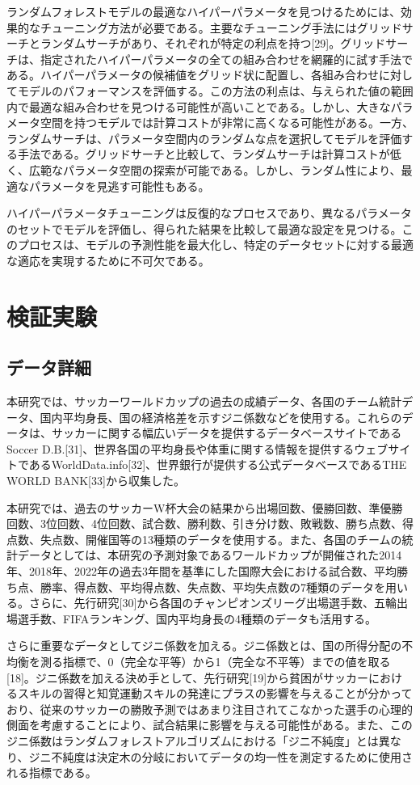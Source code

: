 \documentclass[platex]{suribt}
\begin{document}
ランダムフォレストモデルの最適なハイパーパラメータを見つけるためには、効果的なチューニング方法が必要である。主要なチューニング手法にはグリッドサーチとランダムサーチがあり、それぞれが特定の利点を持つ[29]。グリッドサーチは、指定されたハイパーパラメータの全ての組み合わせを網羅的に試す手法である。ハイパーパラメータの候補値をグリッド状に配置し、各組み合わせに対してモデルのパフォーマンスを評価する。この方法の利点は、与えられた値の範囲内で最適な組み合わせを見つける可能性が高いことである。しかし、大きなパラメータ空間を持つモデルでは計算コストが非常に高くなる可能性がある。一方、ランダムサーチは、パラメータ空間内のランダムな点を選択してモデルを評価する手法である。グリッドサーチと比較して、ランダムサーチは計算コストが低く、広範なパラメータ空間の探索が可能である。しかし、ランダム性により、最適なパラメータを見逃す可能性もある。

ハイパーパラメータチューニングは反復的なプロセスであり、異なるパラメータのセットでモデルを評価し、得られた結果を比較して最適な設定を見つける。このプロセスは、モデルの予測性能を最大化し、特定のデータセットに対する最適な適応を実現するために不可欠である。


\chapter{検証実験}
\section{データ詳細}
本研究では、サッカーワールドカップの過去の成績データ、各国のチーム統計データ、国内平均身長、国の経済格差を示すジニ係数などを使用する。これらのデータは、サッカーに関する幅広いデータを提供するデータベースサイトであるSoccer D.B.[31]、世界各国の平均身長や体重に関する情報を提供するウェブサイトであるWorldData.info[32]、世界銀行が提供する公式データベースであるTHE WORLD BANK[33]から収集した。

本研究では、過去のサッカーW杯大会の結果から出場回数、優勝回数、準優勝回数、3位回数、4位回数、試合数、勝利数、引き分け数、敗戦数、勝ち点数、得点数、失点数、開催国等の13種類のデータを使用する。また、各国のチームの統計データとしては、本研究の予測対象であるワールドカップが開催された2014年、2018年、2022年の過去3年間を基準にした国際大会における試合数、平均勝ち点、勝率、得点数、平均得点数、失点数、平均失点数の7種類のデータを用いる。さらに、先行研究[30]から各国のチャンピオンズリーグ出場選手数、五輪出場選手数、FIFAランキング、国内平均身長の4種類のデータも活用する。

さらに重要なデータとしてジニ係数を加える。ジニ係数とは、国の所得分配の不均衡を測る指標で、0（完全な平等）から1（完全な不平等）までの値を取る[18]。ジニ係数を加える決め手として、先行研究[19]から貧困がサッカーにおけるスキルの習得と知覚運動スキルの発達にプラスの影響を与えることが分かっており、従来のサッカーの勝敗予測ではあまり注目されてこなかった選手の心理的側面を考慮することにより、試合結果に影響を与える可能性がある。また、このジニ係数はランダムフォレストアルゴリズムにおける「ジニ不純度」とは異なり、ジニ不純度は決定木の分岐においてデータの均一性を測定するために使用される指標である。
\end{document}

